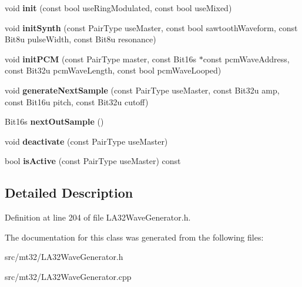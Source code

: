 \begin{DoxyCompactItemize}
\item 
\hypertarget{classMT32Emu_1_1LA32PartialPair_ab819928850e210a487c771c4de3846fc}{void {\bfseries init} (const bool use\-Ring\-Modulated, const bool use\-Mixed)}\label{classMT32Emu_1_1LA32PartialPair_ab819928850e210a487c771c4de3846fc}

\item 
\hypertarget{classMT32Emu_1_1LA32PartialPair_af7cf61267244636428e1a0fb5dd195c4}{void {\bfseries init\-Synth} (const Pair\-Type use\-Master, const bool sawtooth\-Waveform, const Bit8u pulse\-Width, const Bit8u resonance)}\label{classMT32Emu_1_1LA32PartialPair_af7cf61267244636428e1a0fb5dd195c4}

\item 
\hypertarget{classMT32Emu_1_1LA32PartialPair_a7581724a39d513483567a19d27b68114}{void {\bfseries init\-P\-C\-M} (const Pair\-Type master, const Bit16s $\ast$const pcm\-Wave\-Address, const Bit32u pcm\-Wave\-Length, const bool pcm\-Wave\-Looped)}\label{classMT32Emu_1_1LA32PartialPair_a7581724a39d513483567a19d27b68114}

\item 
\hypertarget{classMT32Emu_1_1LA32PartialPair_ab5c606b0397946c7af23c03de62f3ebd}{void {\bfseries generate\-Next\-Sample} (const Pair\-Type use\-Master, const Bit32u amp, const Bit16u pitch, const Bit32u cutoff)}\label{classMT32Emu_1_1LA32PartialPair_ab5c606b0397946c7af23c03de62f3ebd}

\item 
\hypertarget{classMT32Emu_1_1LA32PartialPair_af8e6766879624354d1a298b1f5f76a1c}{Bit16s {\bfseries next\-Out\-Sample} ()}\label{classMT32Emu_1_1LA32PartialPair_af8e6766879624354d1a298b1f5f76a1c}

\item 
\hypertarget{classMT32Emu_1_1LA32PartialPair_a97a0fb142d92c0812986c8b345cdc823}{void {\bfseries deactivate} (const Pair\-Type use\-Master)}\label{classMT32Emu_1_1LA32PartialPair_a97a0fb142d92c0812986c8b345cdc823}

\item 
\hypertarget{classMT32Emu_1_1LA32PartialPair_aa4e228838df605a6cc694cd257393d9e}{bool {\bfseries is\-Active} (const Pair\-Type use\-Master) const }\label{classMT32Emu_1_1LA32PartialPair_aa4e228838df605a6cc694cd257393d9e}

\end{DoxyCompactItemize}


\subsection{Detailed Description}


Definition at line 204 of file L\-A32\-Wave\-Generator.\-h.



The documentation for this class was generated from the following files\-:\begin{DoxyCompactItemize}
\item 
src/mt32/L\-A32\-Wave\-Generator.\-h\item 
src/mt32/L\-A32\-Wave\-Generator.\-cpp\end{DoxyCompactItemize}
